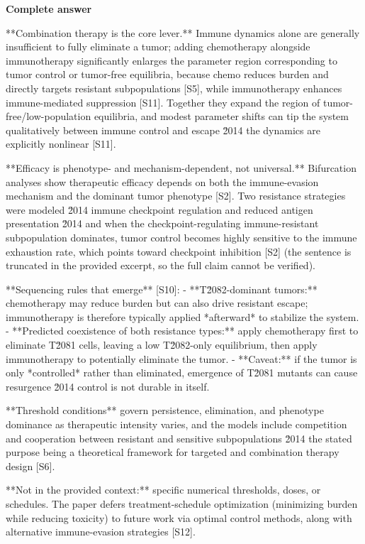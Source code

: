 \documentclass[10pt]{article}
\begin{document}
\textbf{Complete answer}
\begin{AnswerText}
**Combination therapy is the core lever.** Immune dynamics alone are generally insufficient to fully eliminate a tumor; adding chemotherapy alongside immunotherapy significantly enlarges the parameter region corresponding to tumor control or tumor-free equilibria, because chemo reduces burden and directly targets resistant subpopulations [S5], while immunotherapy enhances immune-mediated suppression [S11]. Together they expand the region of tumor-free/low-population equilibria, and modest parameter shifts can tip the system qualitatively between immune control and escape \u2014 the dynamics are explicitly nonlinear [S11].

**Efficacy is phenotype- and mechanism-dependent, not universal.** Bifurcation analyses show therapeutic efficacy depends on both the immune-evasion mechanism and the dominant tumor phenotype [S2]. Two resistance strategies were modeled \u2014 immune checkpoint regulation and reduced antigen presentation \u2014 and when the checkpoint-regulating immune-resistant subpopulation dominates, tumor control becomes highly sensitive to the immune exhaustion rate, which points toward checkpoint inhibition [S2] (the sentence is truncated in the provided excerpt, so the full claim cannot be verified).

**Sequencing rules that emerge** [S10]:
- **T\u2082-dominant tumors:** chemotherapy may reduce burden but can also drive resistant escape; immunotherapy is therefore typically applied *afterward* to stabilize the system.
- **Predicted coexistence of both resistance types:** apply chemotherapy first to eliminate T\u2081 cells, leaving a low T\u2082-only equilibrium, then apply immunotherapy to potentially eliminate the tumor.
- **Caveat:** if the tumor is only *controlled* rather than eliminated, emergence of T\u2081 mutants can cause resurgence \u2014 control is not durable in itself.

**Threshold conditions** govern persistence, elimination, and phenotype dominance as therapeutic intensity varies, and the models include competition and cooperation between resistant and sensitive subpopulations \u2014 the stated purpose being a theoretical framework for targeted and combination therapy design [S6].

**Not in the provided context:** specific numerical thresholds, doses, or schedules. The paper defers treatment-schedule optimization (minimizing burden while reducing toxicity) to future work via optimal control methods, along with alternative immune-evasion strategies [S12].
\end{AnswerText}
\end{document}
